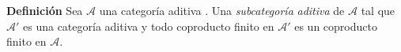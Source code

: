 \documentclass[preview]{standalone}
\begin{document}
\begin{center}
\justifying \textbf{Definición} Sea $\mathscr{A}$ una categoría aditiva . Una \emph{subcategoría} \emph{aditiva} de $\mathscr{A}$ tal que $\mathscr{A}'$ es una categoría aditiva y todo coproducto finito en $\mathscr{A}'$ es un coproducto finito en $\mathscr{A}$.
\end{center}
\end{document}
